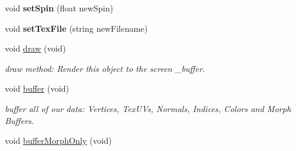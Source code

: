 \begin{DoxyCompactItemize}
\item 
\hypertarget{class_particle_ac0cd12e63886b12d2b99549ecb552838}{void {\bfseries set\-Spin} (float new\-Spin)}\label{class_particle_ac0cd12e63886b12d2b99549ecb552838}

\item 
\hypertarget{class_particle_a5a387ad04e530af85dcd64763282d3a0}{void {\bfseries set\-Tex\-File} (string new\-Filename)}\label{class_particle_a5a387ad04e530af85dcd64763282d3a0}

\item 
\hypertarget{class_object_a53e2ee7f548550be014126bed139fe69}{void \hyperlink{class_object_a53e2ee7f548550be014126bed139fe69}{draw} (void)}\label{class_object_a53e2ee7f548550be014126bed139fe69}

\begin{DoxyCompactList}\small\item\em draw method\-: Render this object to the screen \-\_\-buffer. \end{DoxyCompactList}\item 
\hypertarget{class_object_a7edb92c30d86b6479b0ff2a5e9f06e13}{void \hyperlink{class_object_a7edb92c30d86b6479b0ff2a5e9f06e13}{buffer} (void)}\label{class_object_a7edb92c30d86b6479b0ff2a5e9f06e13}

\begin{DoxyCompactList}\small\item\em buffer all of our data\-: Vertices, Tex\-U\-Vs, Normals, Indices, Colors and Morph Buffers. \end{DoxyCompactList}\item 
\hypertarget{class_object_a293792abfe0671e00a0ec10e85ea9d9e}{void \hyperlink{class_object_a293792abfe0671e00a0ec10e85ea9d9e}{buffer\-Morph\-Only} (void)}\label{class_object_a293792abfe0671e00a0ec10e85ea9d9e}


\end{DoxyCompactItemize}

